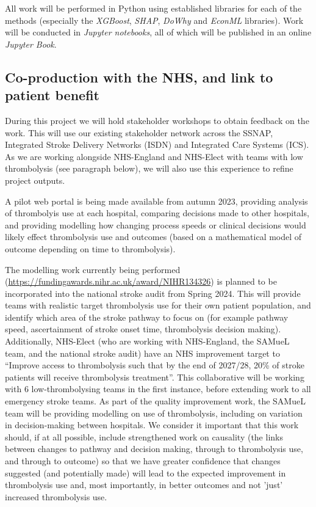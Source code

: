 All work will be performed in Python using established libraries for each of the methods (especially the \textit{XGBoost}, \textit{SHAP}, \textit{DoWhy} and \textit{EconML} libraries). Work will be conducted in \textit{Jupyter notebooks}, all of which will be published in an online \textit{Jupyter Book}.

\subsection{Co-production with the NHS, and link to patient benefit}

During this project we will hold stakeholder workshops to obtain feedback on the work. This will use our existing stakeholder network across the SSNAP, Integrated Stroke Delivery Networks (ISDN) and Integrated Care Systems (ICS). As we are working alongside NHS-England and NHS-Elect with teams with low thrombolysis (see paragraph below), we will also use this experience to refine project outputs.

A pilot web portal is being made available from autumn 2023, providing analysis of thrombolyis use at each hospital, comparing decisions made to other hospitals, and providing modelling how changing process speeds or clinical decisions would likely effect thrombolysis use and outcomes (based on a mathematical model of outcome depending on time to thrombolysis).

The modelling work currently being performed (\url{https://fundingawards.nihr.ac.uk/award/NIHR134326}) is planned to be incorporated into the national stroke audit from Spring 2024. This will provide teams with realistic target thrombolysis use for their own patient population, and identify which area of the stroke pathway to focus on (for example pathway speed, ascertainment of stroke onset time, thrombolysis decision making). Additionally, NHS-Elect (who are working with NHS-England, the SAMueL team, and the national stroke audit) have an NHS improvement target to “Improve access to thrombolysis such that by the end of 2027/28, 20\% of stroke patients will receive thrombolysis treatment”. This collaborative will be working with 6 low-thrombolysing teams in the first instance, before extending work to all emergency stroke teams. As part of the quality improvement work, the SAMueL team will be providing modelling on use of thrombolysis, including on variation in decision-making between hospitals. We consider it important that this work should, if at all possible, include strengthened work on causality (the links between changes to pathway and decision making, through to thrombolysis use, and through to outcome) so that we have greater confidence that changes suggested (and potentially made) will lead to the expected improvement in thrombolysis use and, most importantly, in better outcomes and not 'just' increased thrombolysis use.

